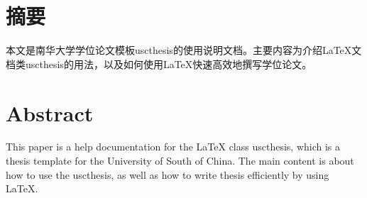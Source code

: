 \maketitle%
\intobmk\section*{摘\quad 要}%
\setcounter{page}{1}%

本文是南华大学学位论文模板uscthesis的使用说明文档。主要内容为介绍\LaTeX{}文档类uscthesis的用法，以及如何使用\LaTeX{}快速高效地撰写学位论文。


\intobmk\section*{Abstract}%

This paper is a help documentation for the \LaTeX{} class uscthesis, which is  a thesis template for the University of South of China. The main content is about how to use the uscthesis, as well as how to write thesis efficiently by using \LaTeX{}.

